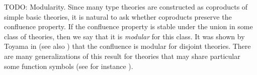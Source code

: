 \documentclass[reqno]{amsart}
\theoremstyle{definition}
\theoremstyle{remark}
\numberwithin{figure}{section}
\begin{document}
TODO: Modularity.
Since many type theories are constructed as coproducts of simple basic theories, it is natural to ask whether coproducts preserve the confluence property.
If the confluence property is stable under the union in some class of theories, then we say that it is \emph{modular} for this class.
It was shown by Toyama in \cite{toyama} (see also \cite{klop-confluence,oostrom-confluence}) that the confluence is modular for disjoint theories.
There are many generalizations of this result for theories that may share particular some function symbols (see for instance \cite{ohlebusch-confluence,ohlebusch-composable,middeldorp-completeness}).



\end{document}
